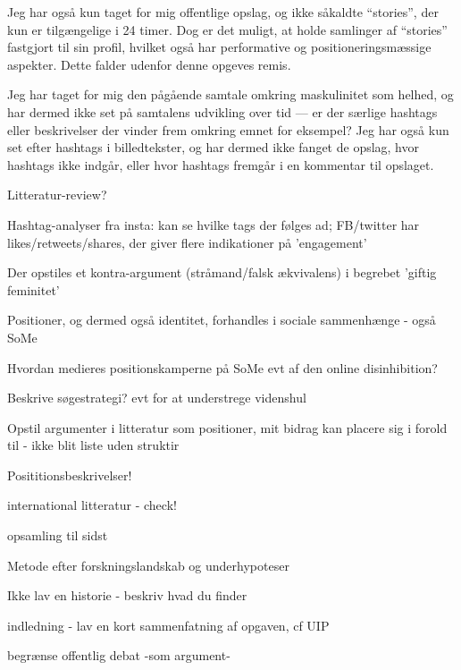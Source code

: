 Jeg har også kun taget for mig offentlige opslag, og ikke såkaldte 
“stories”, der kun er tilgængelige i 24 timer. Dog er det muligt, 
at holde samlinger af “stories” fastgjort til sin profil, hvilket 
også har performative og positioneringsmæssige aspekter. Dette 
falder udenfor denne opgeves remis.

Jeg har taget for mig den pågående samtale omkring maskulinitet 
som helhed, og har dermed ikke set på samtalens udvikling over tid 
— er der særlige hashtags eller beskrivelser der vinder frem 
omkring emnet for eksempel? Jeg har også kun set efter hashtags i 
billedtekster, og har dermed ikke fanget de opslag, hvor hashtags 
ikke indgår, eller hvor hashtags fremgår i en kommentar til 
opslaget.


Litteratur-review?

Hashtag-analyser fra insta: kan se hvilke tags der følges ad;
FB/twitter har likes/retweets/shares, der giver flere indikationer
på 'engagement'

Der opstiles et kontra-argument (stråmand/falsk ækvivalens) i
begrebet 'giftig feminitet'

Positioner, og dermed også identitet, forhandles i sociale
sammenhænge - også SoMe 

Hvordan medieres positionskamperne på SoMe evt af den online
disinhibition?

Beskrive søgestrategi? evt for at understrege videnshul

Opstil argumenter i litteratur som positioner, mit bidrag kan
placere sig i forold til - ikke blit liste uden struktir

Posititionsbeskrivelser!

international litteratur - check! 

opsamling til sidst

Metode efter forskningslandskab og underhypoteser

Ikke lav en historie - beskriv hvad du finder

indledning - lav en kort sammenfatning af opgaven, cf UIP

begrænse offentlig debat -som argument-
